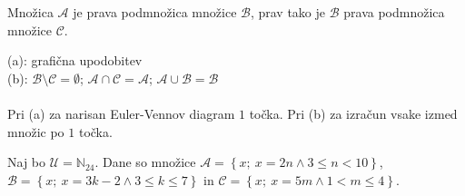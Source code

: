 \documentclass[addpoints]{exam}
\begin{document}
\begin{questions}
    \question
    Množica $\mathcal{A}$ je prava podmnožica množice $\mathcal{B}$, prav tako je $\mathcal{B}$ prava podmnožica množice $\mathcal{C}$.

    \begin{solution}[1cm]
        (a): grafična upodobitev \\
        (b): $\mathcal{B}\setminus\mathcal{C}=\emptyset$; $\mathcal{A}\cap\mathcal{C}=\mathcal{A}$; $\mathcal{A}\cup\mathcal{B}=\mathcal{B}$ \\ \\
        Pri (a) za narisan Euler-Vennov diagram $1$ točka. Pri (b) za izračun vsake izmed množic po $1$ točka.
    \end{solution}





    \question
    Naj bo $\mathcal{U}=\mathbb{N}_{24}$. Dane so množice $\mathcal{A}=\left\{x;\ x=2n \land 3\leq n<10\right\}$, $\mathcal{B}=\left\{x;\ x=3k-2 \land 3\leq k\leq 7\right\}$ in $\mathcal{C}=\left\{x;\ x=5m \land 1<m\leq 4\right\}$. 


\end{questions}
\end{document}
